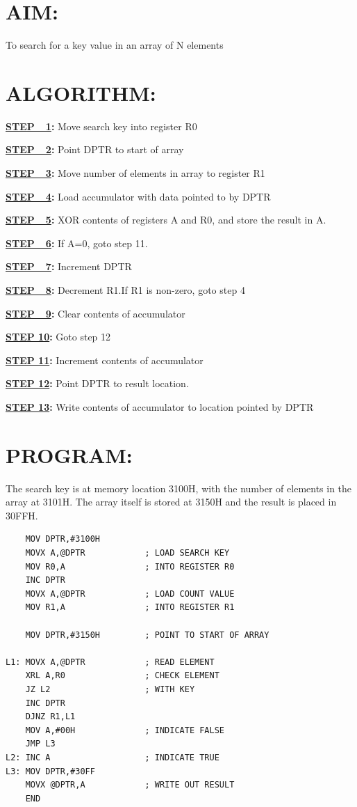\documentclass[a4paper,28pt]{report}
\begin{document}
\section*{AIM:}
To search for a key value in an array of N elements
\section*{ALGORITHM:}
\textbf{\underline{STEP\ \ 1}:} Move search key into register R0


\textbf{\underline{STEP\ \ 2}:}  Point DPTR to start of array

\textbf{\underline{STEP\ \ 3}:}  Move number of elements in array to register R1

\textbf{\underline{STEP\ \ 4}:}  Load accumulator with data pointed to by DPTR

\textbf{\underline{STEP\ \ 5}:}  XOR contents of registers A and R0, and store the result in A.

\textbf{\underline{STEP\ \ 6}:}  If A=0, goto step 11.

\textbf{\underline{STEP\ \ 7}:}  Increment DPTR

\textbf{\underline{STEP\ \ 8}:}  Decrement R1.If R1 is non-zero, goto step 4

\textbf{\underline{STEP\ \ 9}:}  Clear contents of accumulator

\textbf{\underline{STEP 10}:} Goto step 12

\textbf{\underline{STEP 11}:} Increment contents of accumulator

\textbf{\underline{STEP 12}:} Point DPTR to result location.

\textbf{\underline{STEP 13}:} Write contents of accumulator to location pointed by DPTR
\newpage
\section*{PROGRAM:}
The search key is at memory location 3100H, with the number of elements in the array at 3101H. The array itself is stored at 3150H and the result is placed in 30FFH.\newline
\begin{lstlisting}
    MOV DPTR,#3100H
    MOVX A,@DPTR            ; LOAD SEARCH KEY
    MOV R0,A                ; INTO REGISTER R0
    INC DPTR
    MOVX A,@DPTR            ; LOAD COUNT VALUE
    MOV R1,A                ; INTO REGISTER R1
    
    MOV DPTR,#3150H         ; POINT TO START OF ARRAY
              
L1: MOVX A,@DPTR            ; READ ELEMENT
    XRL A,R0                ; CHECK ELEMENT
    JZ L2                   ; WITH KEY
    INC DPTR
    DJNZ R1,L1
    MOV A,#00H              ; INDICATE FALSE
    JMP L3
L2: INC A                   ; INDICATE TRUE
L3: MOV DPTR,#30FF
    MOVX @DPTR,A            ; WRITE OUT RESULT
    END
\end{lstlisting}
\end{document}
